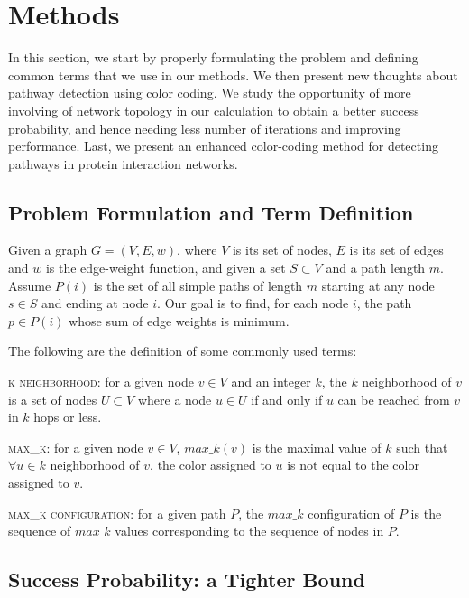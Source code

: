 \documentclass{ws-procs11x85}
\begin{document}
\section{Methods}

In this section, we start by properly formulating the problem and defining
common terms that we use in our methods. We then present new thoughts about
pathway detection using color coding. We study the opportunity of more involving
of network topology in our calculation to obtain a better success probability,
and hence needing less number of iterations and improving performance. Last, we
present an enhanced color-coding method for detecting pathways in protein
interaction networks.

\subsection{Problem Formulation and Term Definition}
Given a graph $G = (V, E, w)$, where $V$ is its set of nodes, $E$ is its set of
edges and $w$ is the edge-weight function, and given a set $S \subset V$ and a
path length $m$. Assume $P(i)$ is the set of all simple paths of length $m$
starting at any node $s \in S$ and ending at node $i$. Our goal is to find, for
each node $i$, the path $p \in P(i)$ whose sum of edge weights is minimum.

The following are the definition of some commonly used terms:
\begin{arabiclist}[3]
\item {\scshape k neighborhood}: for a given node $v \in V$ and an integer $k$,
the $k$ neighborhood of $v$ is a set of nodes  $U \subset V$ where a node $u \in
U$ if and only if $u$ can be reached from $v$ in $k$ hops or less.
\item {\scshape max\_k}: for a given node $v \in V$, $max\_k(v)$ is the maximal
value of $k$ such that $\forall u \in k$ neighborhood of $v$, the color assigned
to $u$ is not equal to the color assigned to $v$.
\item {\scshape max\_k configuration}: for a given path $P$, the $max\_k$
configuration of $P$ is the sequence of $max\_k$ values corresponding to the
sequence of nodes in $P$.
\end{arabiclist}

\subsection{Success Probability: a Tighter Bound}
\end{document}
